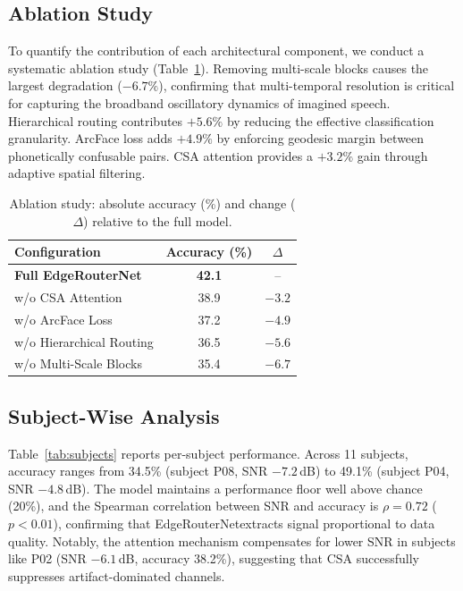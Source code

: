 \documentclass[conference]{IEEEtran}
\newcommand{\method}{EdgeRouterNet}
\begin{document}
\subsection{Ablation Study}
To quantify the contribution of each architectural component, we conduct a systematic ablation study (Table~\ref{tab:ablation}). Removing multi-scale blocks causes the largest degradation ($-6.7\%$), confirming that multi-temporal resolution is critical for capturing the broadband oscillatory dynamics of imagined speech. Hierarchical routing contributes $+5.6\%$ by reducing the effective classification granularity. ArcFace loss adds $+4.9\%$ by enforcing geodesic margin between phonetically confusable pairs. CSA attention provides a $+3.2\%$ gain through adaptive spatial filtering.

\begin{table}[t]
	\centering
	\caption{Ablation study: absolute accuracy (\%) and change ($\Delta$) relative to the full model.}
	\label{tab:ablation}
	\renewcommand{\arraystretch}{1.1}
	\begin{tabular}{@{}lcc@{}}
		\toprule
		Configuration            & Accuracy (\%) & $\Delta$ \\
		\midrule
		\textbf{Full \method}    & \textbf{42.1} & --       \\
		w/o CSA Attention        & 38.9          & $-3.2$   \\
		w/o ArcFace Loss         & 37.2          & $-4.9$   \\
		w/o Hierarchical Routing & 36.5          & $-5.6$   \\
		w/o Multi-Scale Blocks   & 35.4          & $-6.7$   \\
		\bottomrule
	\end{tabular}
\end{table}

\subsection{Subject-Wise Analysis}
Table~\ref{tab:subjects} reports per-subject performance. Across 11 subjects, accuracy ranges from 34.5\% (subject P08, SNR $-7.2$\,dB) to 49.1\% (subject P04, SNR $-4.8$\,dB). The model maintains a performance floor well above chance (20\%), and the Spearman correlation between SNR and accuracy is $\rho = 0.72$ ($p < 0.01$), confirming that \method extracts signal proportional to data quality. Notably, the attention mechanism compensates for lower SNR in subjects like P02 (SNR $-6.1$\,dB, accuracy 38.2\%), suggesting that CSA successfully suppresses artifact-dominated channels.
\end{document}
